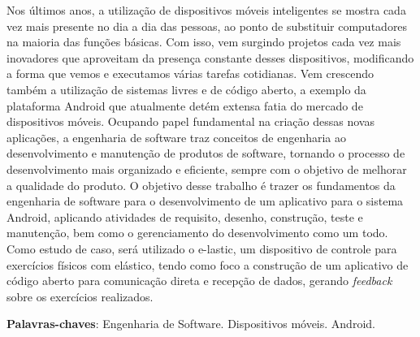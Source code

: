 \begin{resumo}

Nos últimos anos, a utilização de dispositivos móveis inteligentes se mostra cada vez mais presente no dia a dia das pessoas, ao ponto de substituir computadores na maioria das funções básicas. Com isso, vem surgindo projetos cada vez mais inovadores que aproveitam da presença constante desses dispositivos, modificando a forma que vemos e executamos várias tarefas cotidianas. Vem crescendo também a utilização de sistemas livres e de código aberto, a exemplo da plataforma Android que atualmente detém extensa fatia do mercado de dispositivos móveis. Ocupando papel fundamental na criação dessas novas aplicações, a engenharia de software traz conceitos de engenharia ao desenvolvimento e manutenção de produtos de software, tornando o processo de desenvolvimento mais organizado e eficiente, sempre com o objetivo de melhorar a qualidade do produto. O objetivo desse trabalho é trazer os fundamentos da engenharia de software para o desenvolvimento de um aplicativo para o sistema Android, aplicando atividades de requisito, desenho, construção, teste e manutenção, bem como o gerenciamento do desenvolvimento como um todo. Como estudo de caso, será utilizado o e-lastic, um dispositivo de controle para exercícios físicos com elástico, tendo como foco a construção de um aplicativo de código aberto para comunicação direta e recepção de dados, gerando \textit{feedback} sobre os exercícios realizados.

\vspace{\onelineskip}
    
 \noindent
 \textbf{Palavras-chaves}: Engenharia de Software. Dispositivos móveis. Android.

\end{resumo}
